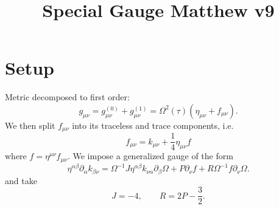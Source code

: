 \documentclass[10pt,letterpaper]{article}
\title{Special Gauge Matthew v9}
\date{}
\begin{document}
\maketitle
\noindent
\section*{Setup}
Metric decomposed to first order:
\begin{equation}
g_{\mu\nu} = g^{(0)}_{\mu\nu} + g^{(1)}_{\mu\nu} = \Omega^2(\tau)(\eta_{\mu\nu}+f_{\mu\nu}).
\end{equation}
We then split $f_{\mu\nu}$ into its traceless and trace components, i.e.
\begin{equation}
	f_{\mu\nu} = k_{\mu\nu} + \frac 14 \eta_{\mu\nu}f
\end{equation}
where $f = \eta^{\mu\nu}f_{\mu\nu}$. 
We impose a generalized gauge of the form
\begin{equation}
	\eta^{\alpha\beta}\partial_{\alpha}k_{\beta\nu} = \Omega^{-1} J \eta^{\alpha\beta}k_{\nu\alpha}\partial_\beta \Omega + P \partial_\nu f + R \Omega^{-1} f \partial_\nu \Omega.
\end{equation}
 and take
\begin{equation}
	J=-4,\qquad R = 2P-\frac32.
\end{equation}
\end{document}
